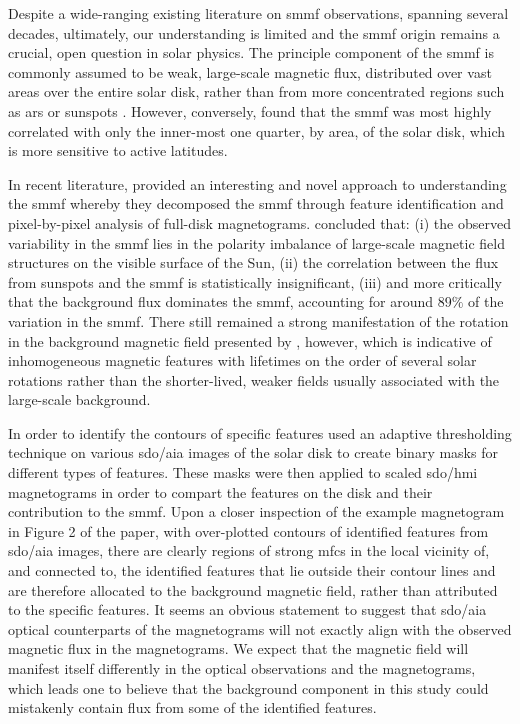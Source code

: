 Despite a wide-ranging existing literature on \gls{smmf} observations, spanning several decades, ultimately, our understanding is limited and the \gls{smmf} origin remains a crucial, open question in solar physics. The principle component of the \gls{smmf} is commonly assumed to be weak, large-scale magnetic flux, distributed over vast areas over the entire solar disk, rather than from more concentrated regions such as \glspl{ar} or sunspots \citep{severny_time_1971, scherrer_mean_1977, xiang_ensemble_2016}. However, conversely, \citet{scherrer_mean_1972} found that the \gls{smmf} was most highly correlated with only the inner-most one quarter, by area, of the solar disk, which is more sensitive to active latitudes.

In recent literature, \citet{bose_variability_2018} provided an interesting and novel approach to understanding the \gls{smmf} whereby they decomposed the \gls{smmf} through feature identification and pixel-by-pixel analysis of full-disk magnetograms. \citet{bose_variability_2018} concluded that: (i) the observed variability in the \gls{smmf} lies in the polarity imbalance of large-scale magnetic field structures on the visible surface of the Sun, (ii) the correlation between the flux from sunspots and the \gls{smmf} is statistically insignificant, (iii) and more critically that the background flux dominates the \gls{smmf}, accounting for around $89 \%$ of the variation in the \gls{smmf}. There still remained a strong manifestation of the rotation in the background magnetic field presented by \citet{bose_variability_2018}, however, which is indicative of inhomogeneous magnetic features with lifetimes on the order of several solar rotations rather than the shorter-lived, weaker fields usually associated with the large-scale background. 

In order to identify the contours of specific features \citet{bose_variability_2018} used an adaptive thresholding technique on various \gls{sdo/aia} images of the solar disk to create binary masks for different types of features. These masks were then applied to scaled \gls{sdo/hmi} magnetograms in order to compart the features on the disk and their contribution to the \gls{smmf}. Upon a closer inspection of the example magnetogram in Figure 2 of the paper, with over-plotted contours of identified features from \gls{sdo/aia} images, there are clearly regions of strong \glspl{mfc} in the local vicinity of, and connected to, the identified features that lie outside their contour lines and are therefore allocated to the background magnetic field, rather than attributed to the specific features. It seems an obvious statement to suggest that \gls{sdo/aia} optical counterparts of the magnetograms will not exactly align with the observed magnetic flux in the magnetograms. We expect that the magnetic field will manifest itself differently in the optical observations and the magnetograms, which leads one to believe that the background component in this study could mistakenly contain flux from some of the identified features.

